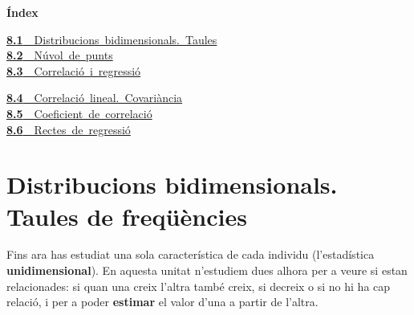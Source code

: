 \documentclass[11pt,a4paper]{article}
\makeatletter
\newcommand{\fmm}[1]{\setbox0=\hbox{$#1$}\ifdim\wd0>0.8\linewidth\def\fmmnext{\fmmdisp{#1}}\else\def\fmmnext{\mbox{\box0}}\fi\fmmnext}
\def\fmmdisp#1{\@ifnextchar.{\fmmdispp{#1}}{\@ifnextchar,{\fmmdispc{#1}}{\@ifnextchar;{\fmmdisps{#1}}{\fmdisp{#1}}}}}
\def\fmmdispp#1.{\fmdisp{#1\,.}}\def\fmmdispc#1,{\fmdisp{#1\,,}}\def\fmmdisps#1;{\fmdisp{#1\,;}}
\newcommand{\fmdisp}[1]{\[\setbox2=\hbox{$\displaystyle #1$}\ifdim\wd2>\linewidth\resizebox{\linewidth}{!}{\box2}\else\box2\fi\]}
\makeatother
\begin{document}
\begin{tcolorbox}[colback=fmsurface,colframe=fmsurface,arc=3mm,left=4mm,right=4mm,top=2mm,bottom=2mm]
\small\textbf{Índex}\par\smallskip
\begin{minipage}[t]{0.49\linewidth}\small \mbox{\hyperlink{sec1}{\textbf{\color{fmgreen}8.1}\ \ Distribucions bidimensionals. Taules}}\\[3pt]
\mbox{\hyperlink{sec2}{\textbf{\color{fmgreen}8.2}\ \ Núvol de punts}}\\[3pt]
\mbox{\hyperlink{sec3}{\textbf{\color{fmgreen}8.3}\ \ Correlació i regressió}}\\[3pt]\end{minipage}\hfill\begin{minipage}[t]{0.49\linewidth}\small \mbox{\hyperlink{sec4}{\textbf{\color{fmgreen}8.4}\ \ Correlació lineal. Covariància}}\\[3pt]
\mbox{\hyperlink{sec5}{\textbf{\color{fmgreen}8.5}\ \ Coeficient de correlació}}\\[3pt]
\mbox{\hyperlink{sec6}{\textbf{\color{fmgreen}8.6}\ \ Rectes de regressió}}\\[3pt]\end{minipage}
\end{tcolorbox}

\section{Distribucions bidimensionals. Taules de freqüències}\hypertarget{sec1}{}

Fins ara has estudiat una sola característica de cada individu (l'estadística \textbf{unidimensional}). En aquesta unitat n'estudiem dues alhora per a veure si estan relacionades: si quan una creix l'altra també creix, si decreix o si no hi ha cap relació, i per a poder \textbf{estimar} el valor d'una a partir de l'altra.

\end{document}
